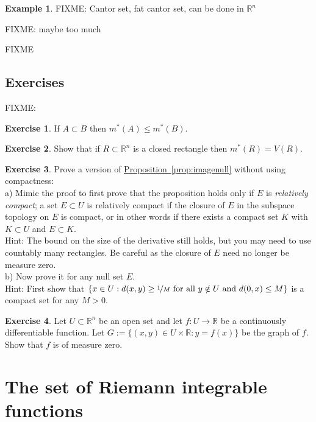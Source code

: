 \documentclass[12pt]{book}
\newcommand{\R}{{\mathbb{R}}}
\newcommand{\myindex}[1]{#1\index{#1}}
\newcommand{\sectionnewpage}{\clearpage}
\theoremstyle{plain}
\theoremstyle{remark}
\theoremstyle{definition}
\theoremstyle{exercise}
\newtheorem{exercise}{Exercise}[section]
\theoremstyle{example}
\newtheorem{example}[thm]{Example}
\newcommand{\propref}[1]{\hyperref[#1]{Proposition~\ref*{#1}}}
\begin{document}
\begin{example}
FIXME: Cantor set, fat cantor set, can be done in $\R^n$

FIXME: maybe too much

FIXME
\end{example}

\subsection{Exercises}

FIXME:

\begin{exercise}
If $A \subset B$ then $m^*(A) \leq m^*(B)$.
\end{exercise}

\begin{exercise}
Show that if $R \subset \R^n$ is a closed rectangle then $m^*(R) = V(R)$.
\end{exercise}

\begin{exercise}
Prove a version of \propref{prop:imagenull} without using compactness:\\
a) Mimic the proof to first prove that the proposition holds only if $E$ is
\emph{\myindex{relatively compact}}; a set $E \subset U$ is relatively
compact if the closure of $E$ in the subspace topology on $E$ is compact,
or in other words if there exists a compact set $K$ with $K \subset U$
and $E \subset K$.\\
Hint: The bound on the size of the derivative still holds, but you may need
to use countably many rectangles.  Be careful as the closure of $E$ need no
longer be measure zero.\\
b) Now prove it for any null set $E$.\\
Hint: First show that $\{ x \in U : d(x,y) \geq
\nicefrac{1}{M} \text{ for all $y \notin U$ and } d(0,x) \leq M \}$ is a compact set for
any $M > 0$.
\end{exercise}

\begin{exercise}
Let $U \subset \R^n$ be an open set
and let $f \colon U \to \R$ be a continuously differentiable function.
Let $G := \{ (x,y) \in U \times \R : y = f(x) \}$ be the graph of $f$.
Show that $f$ is of measure zero.
\end{exercise}



\sectionnewpage
\section{The set of Riemann integrable functions }
\label{sec:riemannlebesgue}
\end{document}
